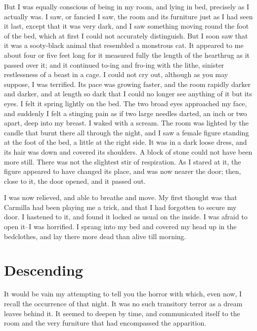 \documentclass[11pt,twoside,makeidx,hidelinks,]{memoir}
\begin{document}
But I was equally conscious of being in my room, and lying in bed,
precisely as I actually was. I saw, or fancied I saw, the room and its
furniture just as I had seen it last, except that it was very dark, and
I saw something moving round the foot of the bed, which at first I
could not accurately distinguish. But I soon saw that it was a
sooty-black animal that resembled a monstrous cat. It appeared to me
about four or five feet long for it measured fully the length of the
hearthrug as it passed over it; and it continued to-ing and fro-ing with
the lithe, sinister restlessness of a beast in a cage. I could not cry
out, although as you may suppose, I was terrified. Its pace was growing
faster, and the room rapidly darker and darker, and at length so dark
that I could no longer see anything of it but its eyes. I felt it spring
lightly on the bed. The two broad eyes approached my face, and suddenly
I felt a stinging pain as if two large needles darted, an inch or two
apart, deep into my breast. I waked with a scream. The room was lighted
by the candle that burnt there all through the night, and I saw a female
figure standing at the foot of the bed, a little at the right side. It
was in a dark loose dress, and its hair was down and covered its
shoulders. A block of stone could not have been more still. There was
not the slightest stir of respiration. As I stared at it, the figure
appeared to have changed its place, and was now nearer the door; then,
close to it, the door opened, and it passed out.

I was now relieved, and able to breathe and move. My first thought was
that Carmilla had been playing me a trick, and that I had forgotten to
secure my door. I hastened to it, and found it locked as usual on the
inside. I was afraid to open it--I was horrified. I sprang into my bed
and covered my head up in the bedclothes, and lay there more dead than
alive till morning.

\pbreak{}

\chapter{Descending}\hypertarget{descending}{}\label{descending}

It would be vain my attempting to tell you the horror with which, even
now, I recall the occurrence of that night. It was no such transitory
terror as a dream leaves behind it. It seemed to deepen by time, and
communicated itself to the room and the very furniture that had
encompassed the apparition.
\end{document}
